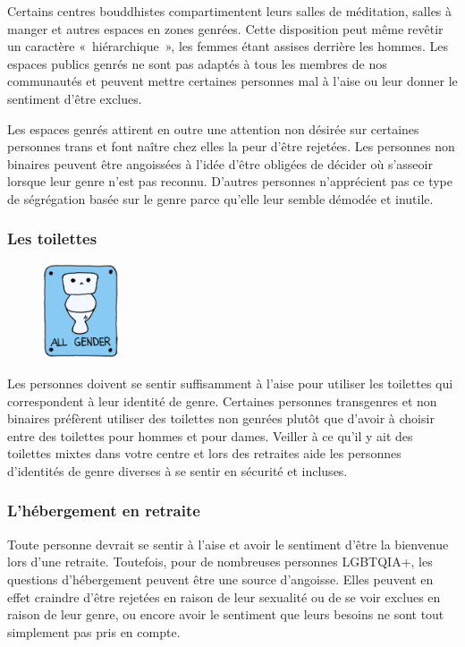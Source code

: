 \documentclass[12pt,openany]{book}
\begin{document}
\noindent Certains centres bouddhistes compartimentent leurs salles de méditation, salles à manger et autres espaces en zones genrées. Cette disposition peut même revêtir un caractère \mbox{« hiérarchique »}, les femmes étant assises derrière les hommes. Les espaces publics genrés ne sont pas adaptés à tous les membres de nos communautés et peuvent mettre certaines personnes mal à l’aise ou leur donner le sentiment d’être exclues.

Les espaces genrés attirent en outre une attention non désirée sur certaines personnes trans et font naître chez elles la peur d’être rejetées. Les personnes non binaires peuvent être angoissées à l’idée d’être obligées de décider où s’asseoir lorsque leur genre n’est pas reconnu. D’autres personnes n’apprécient pas ce type de ségrégation basée sur le genre parce qu’elle leur semble démodée et inutile.

\subsubsection*{Les toilettes}

\begin{figure}
    \centering
    \includegraphics[width=0.2\textwidth]{16.png}
\end{figure}
\noindent Les personnes doivent se sentir suffisamment à l’aise pour utiliser les toilettes qui correspondent à leur identité de genre. Certaines personnes transgenres et non binaires préfèrent utiliser des toilettes non genrées plutôt que d’avoir à choisir entre des toilettes pour hommes et pour dames. Veiller à ce qu’il y ait des toilettes mixtes dans votre centre et lors des retraites aide les personnes d’identités de genre diverses à se sentir en sécurité et incluses.

\subsubsection*{L’hébergement en retraite}

\noindent Toute personne devrait se sentir à l’aise et avoir le sentiment d’être la bienvenue lors d’une retraite. Toutefois, pour de nombreuses personnes \mbox{LGBTQIA+}, les questions d’hébergement peuvent être une source d’angoisse. Elles peuvent en effet craindre d’être rejetées en raison de leur sexualité ou de se voir exclues en raison de leur genre, ou encore avoir le sentiment que leurs besoins ne sont tout simplement pas pris en compte.
\end{document}
